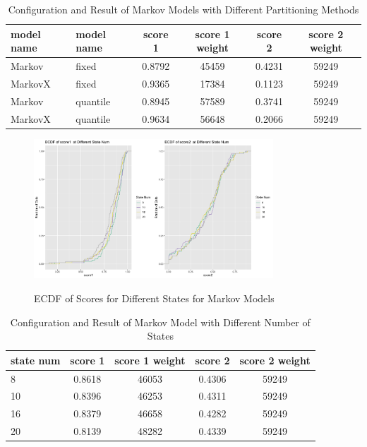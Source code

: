 \documentclass{article}
\begin{document}
\begin{table}[htbp]
  \begin{center}
    \caption{Configuration and Result of Markov Models with Different Partitioning Methods}
    \label{tab:tab1.3.5}
    \begin{tabular}{l|l|*{4}{c}}
      \textbf{model name} & \textbf{model name} & \textbf{score 1} & \textbf{score 1 weight} & \textbf{score 2} & \textbf{score 2 weight} \\
      \hline
      Markov & fixed & 0.8792 & 45459 & 0.4231 & 59249\\
      MarkovX & fixed & 0.9365 & 17384 & 0.1123 & 59249\\
      Markov & quantile & 0.8945 & 57589 & 0.3741 & 59249\\
      MarkovX & quantile & 0.9634 & 56648 & 0.2066 & 59249\\
    \end{tabular}
  \end{center}
\end{table}

\begin{figure}[htbp]
\caption{ECDF of Scores for Different States for Markov Models}
\centering
\includegraphics[width = 0.8\textwidth]{images/ECDFofscoresatDifferentStateNumOfMarkov,840,3,1.png}
\label{fig:fig1.3.6}
\end{figure}

\begin{table}[htbp]
  \begin{center}
    \caption{Configuration and Result of Markov Model with Different Number of States}
    \label{tab:tab1.3.6}
    \begin{tabular}{l|*{4}{c}}
      \textbf{state num} & \textbf{score 1} & \textbf{score 1 weight} & \textbf{score 2} & \textbf{score 2 weight} \\
      \hline
      8 & 0.8618 & 46053 & 0.4306 & 59249\\
      10 & 0.8396 & 46253 & 0.4311 & 59249\\
      16 & 0.8379 & 46658 & 0.4282 & 59249\\
      20 & 0.8139 & 48282 & 0.4339 & 59249\\
    \end{tabular}
  \end{center}
\end{table}
\end{document}
